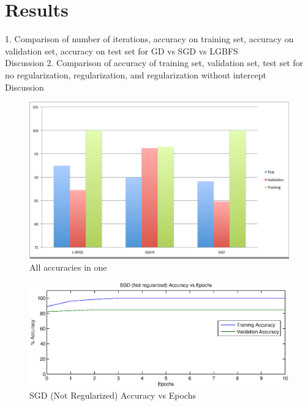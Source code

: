 \documentclass{acm_proc_article-sp}
\begin{document}
\section{Results}
1. Comparison of number of iterations, accuracy on training set, accuracy on validation set, accuracy on test set for GD vs SGD vs LGBFS\\
Discussion
2. Comparison of accuracy of training set, validation set, test set for no regularization, regularization, and regularization without intercept\\
Discussion
\begin{figure}\label{All_accuracies_in_one}
\centering
\includegraphics[scale=0.45]{All_accuracies_in_one.eps}
\caption{All accuracies in one}
\end{figure}

\begin{figure}\label{SGD_(not_Regularized)_Accuracy_vs_Epochs}
\centering
\includegraphics[scale=0.8]{SGD_(not_Regularized)_Accuracy_vs_Epochs.eps}
\caption{SGD (Not Regularized) Accuracy vs Epochs}
\end{figure}
\end{document}
